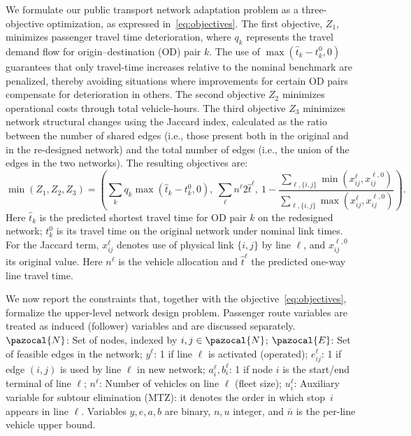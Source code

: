 \documentclass[11pt,a4paper]{article} %
\begin{document}
We formulate our public transport network adaptation problem as a three-objective optimization, as expressed in~\eqref{eq:objectives}. The first objective, $Z_1$, minimizes passenger travel time deterioration, where $q_k$ represents the travel demand flow for origin--destination (OD) pair $k$. The use of $\max(\hat t_k-t_k^0,0)$ guarantees that only travel-time increases relative to the nominal benchmark are penalized, thereby avoiding situations where improvements for certain OD pairs compensate for deterioration in others. The second objective $Z_2$ minimizes operational costs through total vehicle-hours. The third objective $Z_3$ minimizes network structural changes using the Jaccard index, calculated as the ratio between the number of shared edges (i.e., those present both in the original and in the re-designed network) and the total number of edges (i.e., the union of the edges in the two networks). The resulting objectives are:
\begin{equation}
\min (Z_1,Z_2,Z_3)=\left(\sum_k q_k\max(\hat t_k-t_k^0,0),\ \sum_{\ell}n^\ell 2\hat t^\ell,\ 1-\frac{\sum_{\ell,\{i,j\}}\min(x_{ij}^\ell,x_{ij}^{\ell,0})}{\sum_{\ell,\{i,j\}}\max(x_{ij}^\ell,x_{ij}^{\ell,0})}\right).
\label{eq:objectives}
\end{equation}
Here $\hat t_k$ is the predicted shortest travel time for OD pair $k$ on the redesigned network; $t_k^0$ is its travel time on the original network under nominal link times. For the Jaccard term, $x_{ij}^\ell$ denotes use of physical link $\{i,j\}$ by line $\ell$, and $x_{ij}^{\ell,0}$ its original value. Here $n^\ell$ is the vehicle allocation and $\hat t^\ell$ the predicted one-way line travel time.  
%


We now report the constraints that, together with the objective~\eqref{eq:objectives}, formalize the upper-level network design problem. Passenger route variables are treated as induced (follower) variables and are discussed separately. $\pazocal{N}$: Set of nodes, indexed by $i,j \in \pazocal{N}$; $\pazocal{E}$: Set of feasible edges in the network; $y^\ell$: 1 if line $\ell$ is activated (operated); $e_{ij}^\ell$: 1 if edge $(i,j)$ is used by line $\ell$ in new network; $a_i^\ell, b_i^\ell$: 1 if node $i$ is the start/end terminal of line $\ell$; $n^\ell$: Number of vehicles on line $\ell$ (fleet size); $u_i^\ell$: Auxiliary variable for subtour elimination (MTZ): it denotes the order in which stop~$i$ appears in line $\ell$. Variables $y,e,a,b$ are binary, $n,u$ integer, and $\bar n$ is the per-line vehicle upper bound.
\end{document}
